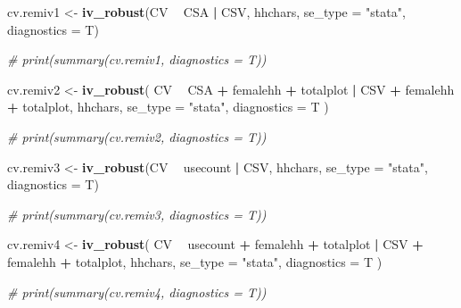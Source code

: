 \documentclass[
]{article}
\newenvironment{Shaded}{\begin{snugshade}}{\end{snugshade}}
\newcommand{\CommentTok}[1]{\textcolor[rgb]{0.56,0.35,0.01}{\textit{#1}}}
\newcommand{\DataTypeTok}[1]{\textcolor[rgb]{0.13,0.29,0.53}{#1}}
\newcommand{\KeywordTok}[1]{\textcolor[rgb]{0.13,0.29,0.53}{\textbf{#1}}}
\newcommand{\NormalTok}[1]{#1}
\newcommand{\OperatorTok}[1]{\textcolor[rgb]{0.81,0.36,0.00}{\textbf{#1}}}
\newcommand{\StringTok}[1]{\textcolor[rgb]{0.31,0.60,0.02}{#1}}
\begin{document}
\begin{Shaded}
\begin{Highlighting}[]
\NormalTok{cv.remiv1 <-}\StringTok{ }\KeywordTok{iv_robust}\NormalTok{(CV }\OperatorTok{~}\StringTok{ }\NormalTok{CSA }\OperatorTok{|}\StringTok{ }\NormalTok{CSV,}
\NormalTok{                       hhchars,}
                       \DataTypeTok{se_type =} \StringTok{"stata"}\NormalTok{,}
                       \DataTypeTok{diagnostics =}\NormalTok{ T)}

\CommentTok{# print(summary(cv.remiv1, diagnostics = T))}



\NormalTok{cv.remiv2 <-}
\StringTok{  }\KeywordTok{iv_robust}\NormalTok{(}
\NormalTok{    CV }\OperatorTok{~}\StringTok{ }\NormalTok{CSA }\OperatorTok{+}\StringTok{ }\NormalTok{femalehh }\OperatorTok{+}\StringTok{ }\NormalTok{totalplot }\OperatorTok{|}
\StringTok{      }\NormalTok{CSV }\OperatorTok{+}\StringTok{ }\NormalTok{femalehh }\OperatorTok{+}\StringTok{ }\NormalTok{totalplot,}
\NormalTok{    hhchars,}
    \DataTypeTok{se_type =} \StringTok{"stata"}\NormalTok{,}
    \DataTypeTok{diagnostics =}\NormalTok{ T}
\NormalTok{  )}

\CommentTok{# print(summary(cv.remiv2, diagnostics = T))}




\NormalTok{cv.remiv3 <-}\StringTok{ }\KeywordTok{iv_robust}\NormalTok{(CV }\OperatorTok{~}\StringTok{ }\NormalTok{usecount }\OperatorTok{|}\StringTok{ }\NormalTok{CSV,}
\NormalTok{                       hhchars,}
                       \DataTypeTok{se_type =} \StringTok{"stata"}\NormalTok{,}
                       \DataTypeTok{diagnostics =}\NormalTok{ T)}

\CommentTok{# print(summary(cv.remiv3, diagnostics = T))}



\NormalTok{cv.remiv4 <-}
\StringTok{  }\KeywordTok{iv_robust}\NormalTok{(}
\NormalTok{    CV }\OperatorTok{~}\StringTok{ }\NormalTok{usecount }\OperatorTok{+}\StringTok{ }\NormalTok{femalehh }\OperatorTok{+}\StringTok{ }\NormalTok{totalplot }\OperatorTok{|}
\StringTok{      }\NormalTok{CSV }\OperatorTok{+}\StringTok{ }\NormalTok{femalehh }\OperatorTok{+}\StringTok{ }\NormalTok{totalplot,}
\NormalTok{    hhchars,}
    \DataTypeTok{se_type =} \StringTok{"stata"}\NormalTok{,}
    \DataTypeTok{diagnostics =}\NormalTok{ T}
\NormalTok{  )}

\CommentTok{# print(summary(cv.remiv4, diagnostics = T))}




\end{Highlighting}
\end{Shaded}
\end{document}
